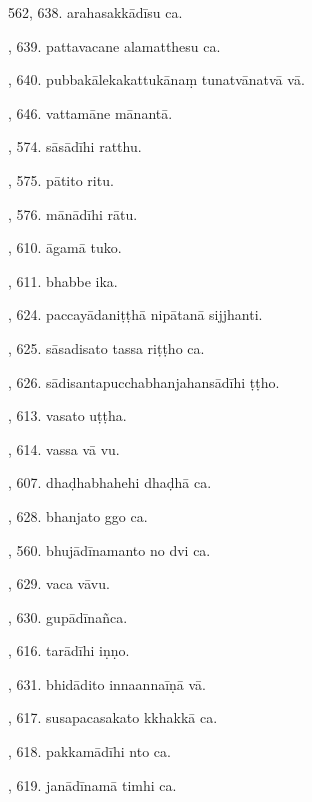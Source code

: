 562, 638. arahasakkādīsu ca.\hfill \pageref{sut:562}\par {}, 639. pattavacane alamatthesu ca.\hfill \pageref{sut:563}\par {}, 640. pubbakālekakattukānaṃ tunatvānatvā vā.\hfill \pageref{sut:564}\par {}, 646. vattamāne mānantā.\hfill \pageref{sut:565}\par {}, 574. sāsādīhi ratthu.\hfill \pageref{sut:566}\par {}, 575. pātito ritu.\hfill \pageref{sut:567}\par {}, 576. mānādīhi rātu.\hfill \pageref{sut:568}\par {}, 610. āgamā tuko.\hfill \pageref{sut:569}\par {}, 611. bhabbe ika.\hfill \pageref{sut:570}\par {}, 624. paccayādaniṭṭhā nipātanā sijjhanti.\hfill \pageref{sut:571}\par {}, 625. sāsadisato tassa riṭṭho ca.\hfill \pageref{sut:572}\par {}, 626. sādisantapucchabhanjahansādīhi ṭṭho.\hfill \pageref{sut:573}\par {}, 613. vasato uṭṭha.\hfill \pageref{sut:574}\par {}, 614. vassa vā vu.\hfill \pageref{sut:575}\par {}, 607. dhaḍhabhahehi dhaḍhā ca.\hfill \pageref{sut:576}\par {}, 628. bhanjato ggo ca.\hfill \pageref{sut:577}\par {}, 560. bhujādīnamanto no dvi ca.\hfill \pageref{sut:578}\par {}, 629. vaca vāvu.\hfill \pageref{sut:579}\par {}, 630. gupādīnañca.\hfill \pageref{sut:580}\par {}, 616. tarādīhi iṇṇo.\hfill \pageref{sut:581}\par {}, 631. bhidādito innaannaīṇā vā.\hfill \pageref{sut:582}\par {}, 617. susapacasakato kkhakkā ca.\hfill \pageref{sut:583}\par {}, 618. pakkamādīhi nto ca.\hfill \pageref{sut:584}\par {}, 619. janādīnamā timhi ca.\hfill \pageref{sut:585}\par \noindent

